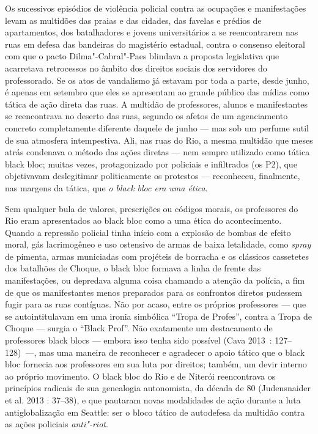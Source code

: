 Os sucessivos episódios de violência policial contra as ocupações e
manifestações levam as multidões das praias e das cidades, das favelas e
prédios de apartamentos, dos batalhadores e jovens universitários a se
reencontrarem nas ruas em defesa das bandeiras do magistério estadual,
contra o consenso eleitoral com que o pacto Dilma"-Cabral"-Paes blindava a
proposta legislativa que acarretava retrocessos no âmbito dos direitos
sociais dos servidores do professorado. Se os atos de vandalismo já
estavam por toda a parte, desde junho, é apenas em setembro que eles se
apresentam ao grande público das mídias como tática de ação direta das
ruas. A multidão de professores, alunos e manifestantes se reencontrava
no deserto das ruas, segundo os afetos de um agenciamento concreto
completamente diferente daquele de junho --- mas sob um perfume sutil de
sua atmosfera intempestiva. Ali, nas ruas do Rio, a mesma multidão que
meses atrás condenava o método das ações diretas --- nem sempre utilizado
como tática black bloc; muitas vezes, protagonizado por policiais e
infiltrados (os P2), que objetivavam deslegitimar politicamente os
protestos --- reconheceu, finalmente, nas margens da tática, que \emph{o
black bloc era uma ética}.

Sem qualquer bula de valores, prescrições ou códigos morais, os
professores do Rio eram apresentados ao black bloc como a uma ética do
acontecimento. Quando a repressão policial tinha início com a explosão
de bombas de efeito moral, gás lacrimogêneo e uso ostensivo de armas de
baixa letalidade, como \emph{spray }de pimenta, armas municiadas com
projéteis de borracha e os clássicos cassetetes dos batalhões de Choque,
o black bloc formava a linha de frente das manifestações, ou depredava
alguma coisa chamando a atenção da polícia, a fim de que os
manifestantes menos preparados para os confrontos diretos pudessem fugir
para as ruas contíguas. Não por acaso, entre os próprios professores ---
que se autointitulavam em uma ironia simbólica ``Tropa de Profes'',
contra a Tropa de Choque --- surgia o ``Black Prof''. Não exatamente um
destacamento de professores black blocs --- embora isso tenha sido
possível (Cava 2013~: 127--128)~---, mas uma maneira de reconhecer e
agradecer o apoio tático que o black bloc fornecia aos professores em
sua luta por direitos; também, um devir interno ao próprio movimento. O
black bloc do Rio e de Niterói reencontrava os princípios radicais de
sua genealogia autonomista, da década de 80 (Judensnaider et al. 2013 :
37--38), e que pautaram novas modalidades de ação durante a luta
antiglobalização em Seattle: ser o bloco tático de autodefesa da
multidão contra as ações policiais \emph{anti"-riot}.

